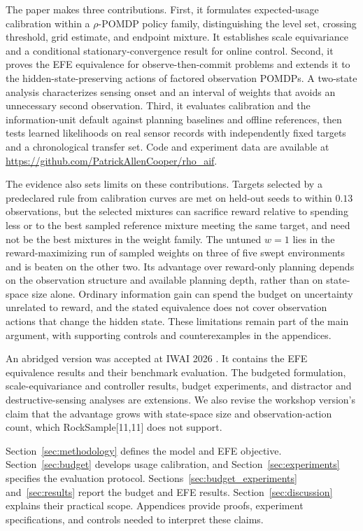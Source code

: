 \documentclass[runningheads]{llncs}
\begin{document}
The paper makes three contributions. First, it formulates expected-usage calibration within a $\rho$-POMDP policy family, distinguishing the level set, crossing threshold, grid estimate, and endpoint mixture. It establishes scale equivariance and a conditional stationary-convergence result for online control. Second, it proves the EFE equivalence for observe-then-commit problems and extends it to the hidden-state-preserving actions of factored observation POMDPs. A two-state analysis characterizes sensing onset and an interval of weights that avoids an unnecessary second observation. Third, it evaluates calibration and the information-unit default against planning baselines and offline references, then tests learned likelihoods on real sensor records with independently fixed targets and a chronological transfer set. Code and experiment data are available at \url{https://github.com/PatrickAllenCooper/rho_aif}.

The evidence also sets limits on these contributions. Targets selected by a predeclared rule from calibration curves are met on held-out seeds to within $0.13$ observations, but the selected mixtures can sacrifice reward relative to spending less or to the best sampled reference mixture meeting the same target, and need not be the best mixtures in the weight family. The untuned $w=1$ lies in the reward-maximizing run of sampled weights on three of five swept environments and is beaten on the other two. Its advantage over reward-only planning depends on the observation structure and available planning depth, rather than on state-space size alone. Ordinary information gain can spend the budget on uncertainty unrelated to reward, and the stated equivalence does not cover observation actions that change the hidden state. These limitations remain part of the main argument, with supporting controls and counterexamples in the appendices.

An abridged version was accepted at IWAI 2026 \citep{cooper2026iwai}. It contains the EFE equivalence results and their benchmark evaluation. The budgeted formulation, scale-equivariance and controller results, budget experiments, and distractor and destructive-sensing analyses are extensions. We also revise the workshop version's claim that the advantage grows with state-space size and observation-action count, which RockSample[11,11] does not support.

Section~\ref{sec:methodology} defines the model and EFE objective. Section~\ref{sec:budget} develops usage calibration, and Section~\ref{sec:experiments} specifies the evaluation protocol. Sections~\ref{sec:budget_experiments} and~\ref{sec:results} report the budget and EFE results. Section~\ref{sec:discussion} explains their practical scope. Appendices provide proofs, experiment specifications, and controls needed to interpret these claims.
\end{document}
